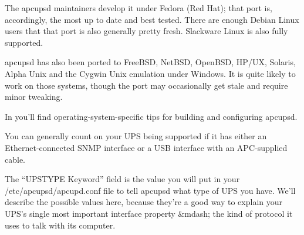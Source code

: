 The apcupsd maintainers develop it under Fedora (Red Hat); that port is,
accordingly, the most up to date and best tested.  There are enough Debian
Linux users that that port is also generally pretty fresh.  Slackware Linux is
also fully supported.  

apcupsd has also been ported to FreeBSD, NetBSD, OpenBSD, HP/UX, Solaris,
Alpha Unix and the Cygwin Unix emulation under Windows. It is quite likely to
work on those systems, though the port may occasionally get stale and require
minor tweaking.  

In 
you'll find operating-system-specific tips for building and configuring
apcupsd.  

You can generally count on your UPS being supported if it has either an
Ethernet-connected SNMP interface or a USB interface with an APC-supplied
cable.  

\label{upstypes}
The ``UPSTYPE Keyword'' field is the value you will put in your
/etc/apcupsd/apcupd.conf file to tell apcupsd what type of UPS you have. 
We'll describe the possible values here, because they're a good way to explain
your UPS's single most important interface property \&mdash; the kind of
protocol it uses to talk with its computer.  

\label{index-UPSTYPE-10}
\label{index-Keywords_002c-USBTYPE-11}

